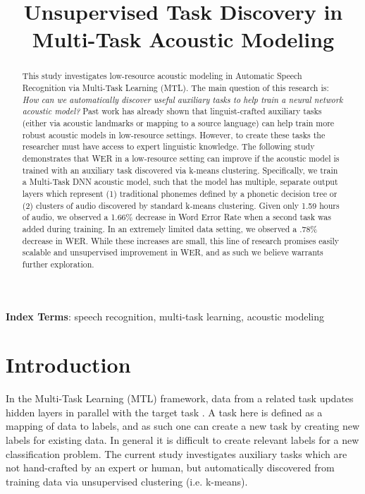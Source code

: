 \documentclass[a4paper]{article}
\title{Unsupervised Task Discovery in Multi-Task Acoustic Modeling}
\begin{document}
\maketitle
% 
\begin{abstract}

  This study investigates low-resource acoustic modeling in Automatic Speech Recognition via Multi-Task Learning (MTL). The main question of this research is: \textit{How can we automatically discover useful auxiliary tasks to help train a neural network acoustic model?} Past work has already shown that linguist-crafted auxiliary tasks (either via acoustic landmarks or mapping to a source language) can help train more robust acoustic models in low-resource settings. However, to create these tasks the researcher must have access to expert linguistic knowledge. The following study demonstrates that WER in a low-resource setting can improve if the acoustic model is trained with an auxiliary task discovered via k-means clustering. Specifically, we train a Multi-Task DNN acoustic model, such that the model has multiple, separate output layers which represent (1) traditional phonemes defined by a phonetic decision tree or (2) clusters of audio discovered by standard k-means clustering. Given only 1.59 hours of audio, we observed a 1.66\% decrease in Word Error Rate when a second task was added during training. In an extremely limited data setting, we observed a .78\% decrease in WER. While these increases are small, this line of research promises easily scalable and unsupervised improvement in WER, and as such we believe warrants further exploration.

  
\end{abstract}

\noindent\textbf{Index Terms}: speech recognition, multi-task learning, acoustic modeling





\section{Introduction}

In the Multi-Task Learning (MTL) framework, data from a related task updates hidden layers in parallel with the target task \cite{caruana1997}. A task here is defined as a mapping of data to labels, and as such one can create a new task by creating new labels for existing data. In general it is difficult to create relevant labels for a new classification problem. The current study investigates auxiliary tasks which are not hand-crafted by an expert or human, but automatically discovered from training data via unsupervised clustering (i.e. k-means).
\end{document}
